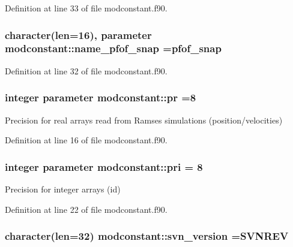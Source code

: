 Definition at line 33 of file modconstant.\+f90.

\subsubsection[{\texorpdfstring{name\+\_\+pfof\+\_\+snap}{name_pfof_snap}}]{\setlength{\rightskip}{0pt plus 5cm}character(len=16), parameter modconstant\+::name\+\_\+pfof\+\_\+snap =\textquotesingle{}pfof\+\_\+snap\textquotesingle{}}\hypertarget{namespacemodconstant_affe7d9379bfee250c843169c7bb10f1c}{}\label{namespacemodconstant_affe7d9379bfee250c843169c7bb10f1c}


Definition at line 32 of file modconstant.\+f90.

\subsubsection[{\texorpdfstring{pr}{pr}}]{\setlength{\rightskip}{0pt plus 5cm}integer parameter modconstant\+::pr =8}\hypertarget{namespacemodconstant_a54966a555666da051c8c851545e11ff7}{}\label{namespacemodconstant_a54966a555666da051c8c851545e11ff7}


Precision for real arrays read from Ramses simulations (position/velocities) 



Definition at line 16 of file modconstant.\+f90.

\subsubsection[{\texorpdfstring{pri}{pri}}]{\setlength{\rightskip}{0pt plus 5cm}integer parameter modconstant\+::pri = 8}\hypertarget{namespacemodconstant_a3463d55217ae4b194f21c061a619c48e}{}\label{namespacemodconstant_a3463d55217ae4b194f21c061a619c48e}


Precision for integer arrays (id) 



Definition at line 22 of file modconstant.\+f90.

\subsubsection[{\texorpdfstring{svn\+\_\+version}{svn_version}}]{\setlength{\rightskip}{0pt plus 5cm}character(len=32) modconstant\+::svn\+\_\+version =S\+V\+N\+R\+EV}\hypertarget{namespacemodconstant_a56d13db2836a9091e5e89be74deaedd6}{}\label{namespacemodconstant_a56d13db2836a9091e5e89be74deaedd6}


